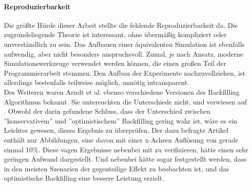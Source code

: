 \paragraph{Reproduzierbarkeit}
Die größte Hürde dieser Arbeit stellte die fehlende Reproduzierbarkeit da. Die zugrundeliegende Theorie ist interessant, ohne übermäßig kompliziert oder unverständlich zu sein. Das Aufbauen einer äquivalenten Simulation ist ebenfalls aufwendig, aber nicht besonders anspruchsvoll. Zumal, je nach Ansatz, moderne Simulationswerkzeuge verwendet werden können, die einen großen Teil der Programmierarbeit stemmen.
Den Aufbau der Experimente nachzuvollziehen, ist allerdings bestenfalls teilweise möglich, unnötig intransparent. \\
Des Weiteren waren Arndt et al. ebenso verschiedene Versionen des Backfilling Algorithmus bekannt. Sie untersuchten die Unterschiede nicht, und verwiesen auf \cite{optVsCons}. Obwohl der darin gefundene Schluss, dass der Unterschied zwischen ''konservativem'' und ''optimistischem'' Backfilling gering wahr ist, wäre es ein Leichtes gewesen, dieses Ergebnis zu überprüfen. Der dazu befragte Artikel enthält nur Abbildungen, eine davon mit einer x-Achsen Auflösung von gerade einmal 10\%. Diese vagen Ergebnisse nebenbei mit zu verifizieren, hätte einen sehr geringen Aufwand dargestellt. Und nebenbei hätte sogar festgestellt werden, dass in den meisten Szenarien der gegenteilige Effekt zu beobachten ist, und das optimistische Backfilling eine bessere Leistung erzielt.

